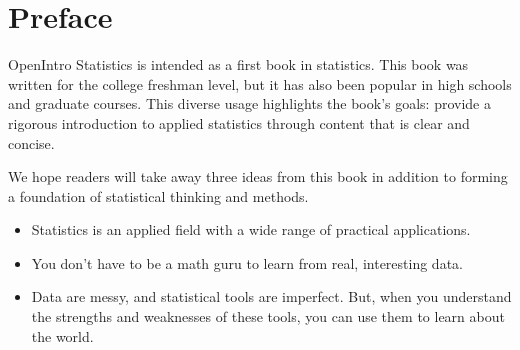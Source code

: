 \chapter*{Preface}

\noindent%
OpenIntro Statistics is intended as a first book in statistics.
This book was written for the college freshman level,
but it has also been popular in high schools and graduate courses.
This diverse usage highlights the book's goals:
provide a rigorous introduction to applied statistics through
content that is clear and concise.
\vspace{3mm}

We hope readers will take away three ideas from
this book in addition to forming a foundation of statistical
thinking and methods.\vspace{-1mm}
\begin{itemize}
\setlength{\itemsep}{0mm}
\item
    Statistics is an applied field with a wide range
    of practical applications.
\item
    You don't have to be a math guru to learn
    from real, interesting data.
\item
    Data are messy, and statistical tools are imperfect.
    But, when you understand the strengths and weaknesses of
    these tools, you can use them to learn about the world.
\end{itemize}


%
%
%


